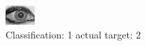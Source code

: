 \begin{figure}[h!]
\begin{center}
\includegraphics[width=0.60\columnwidth]{figures/ID2031_class_1_target_2.png}
\end{center}
\caption{ Classification: 1 actual target: 2}
\label{fig:ID2031_class_1_target_2}
\end{figure}

